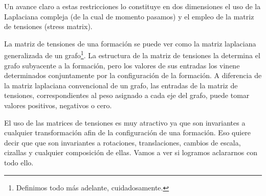 \documentclass[10pt,a4paper]{article}
\begin{document}
Un avance claro a estas restricciones lo constituye en dos dimensiones el uso de la Laplaciana compleja (de la cual de momento pasamos) y el empleo de la matriz de tensiones (stress matrix).

La matriz de tensiones de una formación se puede ver como la matriz laplaciana generalizada de un grafo\footnote{Definimos todo más adelante, cuidadosamente.}. La estructura de la matriz de tensiones la determina el grafo subyacente a la formación, pero los valores de sus entradas los vinene determinados conjuntamente por la configuración de la formación. A diferencia de la matriz laplaciana convencional de un grafo, las entradas de la matriz de tensiones, correspondientes al peso asignado a cada eje del grafo, puede tomar valores positivos, negativos o cero.

El uso de las matrices de tensiones es muy atractivo ya que son invariantes a cualquier transformación afin de la configuración de una formación. Eso quiere decir que que son invariantes a rotaciones, translaciones, cambios de escala, cizallas y cualquier composición de ellas. Vamos a ver si logramos aclararnos con todo ello.
\end{document}

